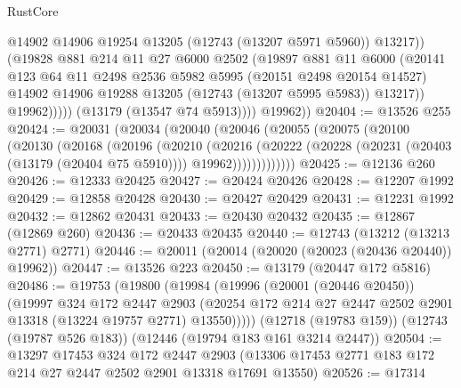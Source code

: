 \begin{lexlean}{RustCore}
\begin{coremodule}
                        @14902
                        @14906
                        @19254
                        @13205
                        (@12743 (@13207 @5971 @5960))
                        @13217))
                    (@19828
                      @881
                      @214
                      @11
                      @27
                      @6000
                      @2502
                      (@19897
                        @881
                        @11
                        @6000
                        (@20141
                          @123
                          @64
                          @11
                          @2498
                          @2536
                          @5982
                          @5995
                          (@20151 @2498 @20154 @14527)
                          @14902
                          @14906
                          @19288
                          @13205
                          (@12743 (@13207 @5995 @5983))
                          @13217))
                      @19962)))))
            (@13179 (@13547 @74 @5913))))
        @19962))
@20404 := @13526 @255
@20424 := @20031
    (@20034
      (@20040
        (@20046
          (@20055
            (@20075
              (@20100
                (@20130
                  (@20168
                    (@20196
                      (@20210
                        (@20216
                          (@20222
                            (@20228
                              (@20231 (@20403 (@13179 (@20404 @75 @5910))))
                              @19962)))))))))))))
@20425 := @12136 @260
@20426 := @12333 @20425
@20427 := @20424 @20426
@20428 := @12207 @1992
@20429 := @12858 @20428
@20430 := @20427 @20429
@20431 := @12231 @1992
@20432 := @12862 @20431
@20433 := @20430 @20432
@20435 := @12867 (@12869 @260)
@20436 := @20433 @20435
@20440 := @12743 (@13212 (@13213 @2771) @2771)
@20446 := @20011 (@20014 (@20020 (@20023 (@20436 @20440)) @19962))
@20447 := @13526 @223
@20450 := @13179 (@20447 @172 @5816)
@20486 := @19753
    (@19800
      (@19984
        (@19996
          (@20001 (@20446 @20450))
          (@19997
            @324
            @172
            @2447
            @2903
            (@20254 @172 @214 @27 @2447 @2502 @2901 @13318 (@13224 @19757 @2771) @13550)))))
    (@12718 (@19783 @159))
    (@12743 (@19787 @526 @183))
    (@12446 (@19794 @183 @161 @3214 @2447))
@20504 := @13297
    @17453
    @324
    @172
    @2447
    @2903
    (@13306 @17453 @2771 @183 @172 @214 @27 @2447 @2502 @2901 @13318 @17691 @13550)
@20526 := @17314

\end{coremodule}
\end{lexlean}
